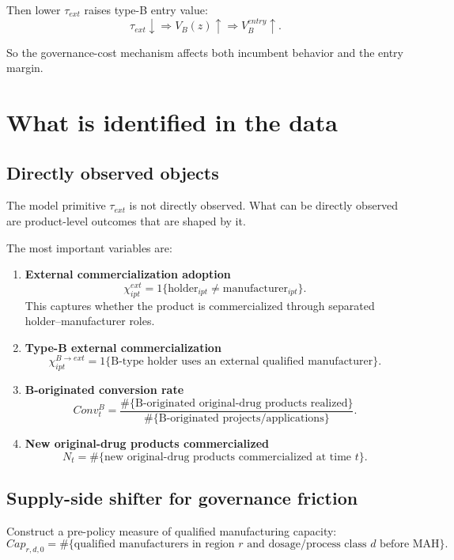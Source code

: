 \documentclass[12pt]{article}
\begin{document}
Then lower \(\tau_{ext}\) raises type-B entry value:
\[
\tau_{ext}\downarrow
\Rightarrow
V_B(z)\uparrow
\Rightarrow
V_B^{entry}\uparrow.
\]

So the governance-cost mechanism affects both incumbent behavior and the entry margin.

\section{What is identified in the data}

\subsection{Directly observed objects}

The model primitive \(\tau_{ext}\) is not directly observed.
What can be directly observed are product-level outcomes that are shaped by it.

The most important variables are:

\begin{enumerate}[leftmargin=2em]
    \item \textbf{External commercialization adoption}
    \[
    \chi^{ext}_{ipt}=1\{\text{holder}_{ipt}\neq \text{manufacturer}_{ipt}\}.
    \]
    This captures whether the product is commercialized through separated holder--manufacturer roles.

    \item \textbf{Type-B external commercialization}
    \[
    \chi^{B\to ext}_{ipt}=1\{\text{B-type holder uses an external qualified manufacturer}\}.
    \]

    \item \textbf{B-originated conversion rate}
    \[
    Conv^B_t
    =
    \frac{\#\{\text{B-originated original-drug products realized}\}}
         {\#\{\text{B-originated projects/applications}\}}.
    \]

    \item \textbf{New original-drug products commercialized}
    \[
    N_t = \#\{\text{new original-drug products commercialized at time } t\}.
    \]
\end{enumerate}

\subsection{Supply-side shifter for governance friction}

Construct a pre-policy measure of qualified manufacturing capacity:
\[
Cap_{r,d,0}
=
\#\{\text{qualified manufacturers in region } r \text{ and dosage/process class } d \text{ before MAH}\}.
\]
\end{document}
